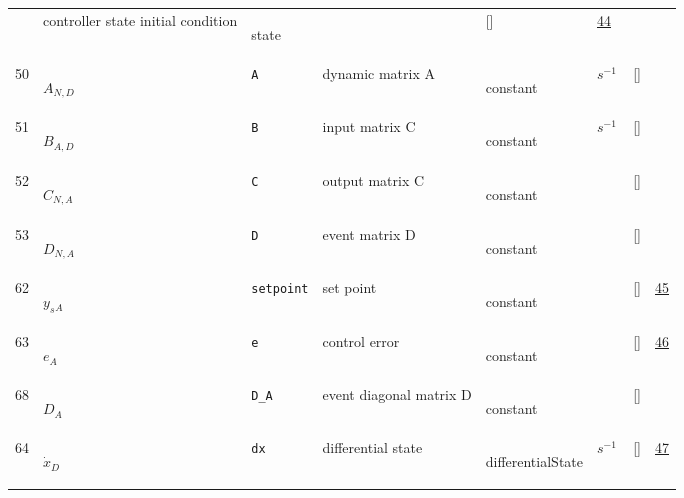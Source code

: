 \begin{longtable}{|p{1cm}|p{3cm}|p{3cm}|p{7cm}|p{3.0cm}|p{3cm}|p{2cm}|p{1cm}|}
             & controller state initial condition
             & \begin{lay}state \end{lay}
             & $  $
             & []
             & \hyperlink{"e:44"}{ 44 }
                 \\
    50
             & \hypertarget{"v:50"}{ $ {A}{_{N, D}} $}
             & \verb|A|
             & dynamic matrix A
             & \begin{lay}constant \end{lay}
             & $ s^{-1} \, $
             & []
             & \\
    51
             & \hypertarget{"v:51"}{ $ {B}{_{A, D}} $}
             & \verb|B|
             & input matrix C
             & \begin{lay}constant \end{lay}
             & $ s^{-1} \, $
             & []
             & \\
    52
             & \hypertarget{"v:52"}{ $ {C}{_{N, A}} $}
             & \verb|C|
             & output matrix C
             & \begin{lay}constant \end{lay}
             & $  $
             & []
             & \\
    53
             & \hypertarget{"v:53"}{ $ {D}{_{N, A}} $}
             & \verb|D|
             & event matrix D
             & \begin{lay}constant \end{lay}
             & $  $
             & []
             & \\
    62
             & \hypertarget{"v:62"}{ $ {{y_s}}{_{A}} $}
             & \verb|setpoint|
             & set point
             & \begin{lay}constant \end{lay}
             & $  $
             & []
             & \hyperlink{"e:45"}{ 45 }
                 \\
    63
             & \hypertarget{"v:63"}{ $ {e}{_{A}} $}
             & \verb|e|
             & control error
             & \begin{lay}constant \end{lay}
             & $  $
             & []
             & \hyperlink{"e:46"}{ 46 }
                 \\
    68
             & \hypertarget{"v:68"}{ $ {D}{_{A}} $}
             & \verb|D_A|
             & event diagonal matrix D
             & \begin{lay}constant \end{lay}
             & $  $
             & []
             & \\
    64
             & \hypertarget{"v:64"}{ $ {{\dot{x}}}{_{D}} $}
             & \verb|dx|
             & differential state
             & \begin{lay}differentialState \end{lay}
             & $ s^{-1} \, $
             & []
             & \hyperlink{"e:47"}{ 47 }
                 \\
    \end{longtable}